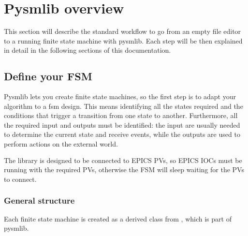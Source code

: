 \documentclass[letterpaper,10pt,english]{sphinxmanual}
\begin{document}
\section{Pysmlib overview}
\label{\detokenize{overview:pysmlib-overview}}\label{\detokenize{overview:id1}}\label{\detokenize{overview::doc}}
This section will describe the standard workflow to go from an empty file
editor to a running finite state machine with pysmlib. Each step will be then
explained in detail in the following sections of this documentation.


\subsection{Define your FSM}
\label{\detokenize{overview:define-your-fsm}}
Pysmlib lets you create finite state machines, so the first step is
to adapt your algorithm to a fsm design. This means identifying all
the states required and the conditions that trigger a transition from
one state to another. Furthermore, all the required input and outputs
must be identified: the input are usually needed to determine the
current state and receive events, while the outputs are used to
perform actions on the external world.

The library is designed to be connected to EPICS PVs, so EPICS IOCs must be
running with the required PVs, otherwise the FSM will sleep waiting for the PVs
to connect.


\subsubsection{General structure}
\label{\detokenize{overview:general-structure}}
Each finite state machine is created as a derived class from {\hyperref[\detokenize{fsm:fsmBase}]{}},
which is part of pysmlib.

%
\begin{sphinxVerbatim}[commandchars=\\\{\}]
   

 
        
          
\end{sphinxVerbatim}
\end{document}
